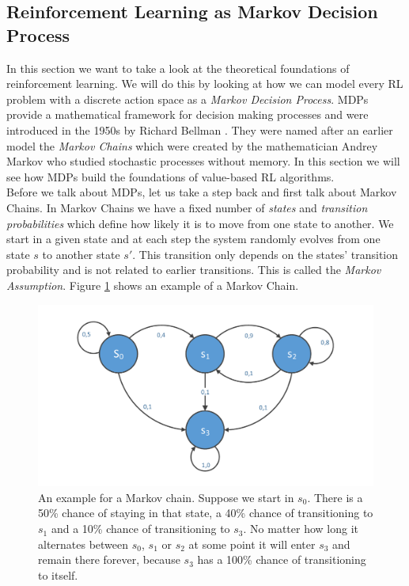 \subsection{Reinforcement Learning as Markov Decision Process} \label{ssec:RLMDP}
In this section we want to take a look at the theoretical foundations of reinforcement learning. We will do this by looking at how we can model every RL problem with a discrete action space as a \textit{Markov Decision Process}. MDPs provide a mathematical framework for decision making processes and were introduced in the 1950s by Richard Bellman \cite{bellman1957markovian}. They were named after an earlier model the \textit{Markov Chains} which were created by the mathematician Andrey Markov who studied stochastic processes without memory. In this section we will see how MDPs build the foundations of value-based RL algorithms. \\
Before we talk about MDPs, let us take a step back and first talk about Markov Chains. In Markov Chains we have a fixed number of \textit{states} and \textit{transition probabilities} which define how likely it is to move from one state to another. We start in a given state and at each step the system randomly evolves from one state $s$ to another state $s'$. This transition only depends on the states' transition probability and is not related to earlier transitions. This is called the \textit{Markov Assumption}. Figure \ref{fig:MarkovChain} shows an example of a Markov Chain. \\

\begin{figure}[ht]
  
  \begin{center}
      \includegraphics[trim=10px 10px 10px 10px, clip, width=0.8\columnwidth]{figures/rl/markov_chain.pdf}
  \end{center}
  
  \caption[An Markov Chain Example]{An example for a Markov chain. Suppose we start in $s_0$. There is a 50\% chance of staying in that state, a 40\% chance of transitioning to $s_1$ and a 10\% chance of transitioning to $s_3$. No matter how long it alternates between $s_0$, $s_1$ or $s_2$ at some point it will enter $s_3$ and remain there forever, because $s_3$ has a 100\% chance of transitioning to itself.}
  \label{fig:MarkovChain}
\end{figure}



